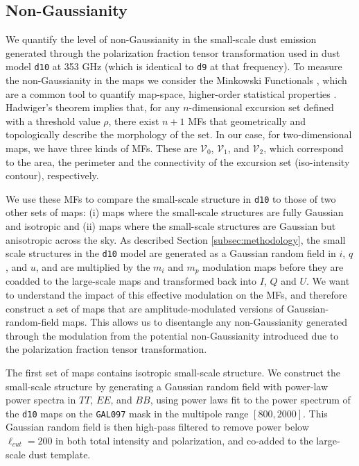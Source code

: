 \documentclass[twocolumn]{aastex631}
\begin{document}
\subsection{Non-Gaussianity} \label{sec:nongaussianity}

We quantify the level of non-Gaussianity in the small-scale dust emission generated through the polarization fraction tensor transformation used in dust model \texttt{d10} at 353 GHz (which is identical to \texttt{d9} at that frequency). To measure the non-Gaussianity in the maps we consider the Minkowski Functionals \citep[MFs,][]{Minkowski1903}, which are a common tool to quantify map-space, higher-order statistical properties \citep{Martire:2023, Carones:2024}. 
Hadwiger’s theorem \citep{hadwigerVorlesungenUeberInhalt1957}
implies that, for any $n$-dimensional excursion set defined with a threshold value $\rho$, there exist $n+1$ MFs that geometrically and topologically describe the morphology of the set. In our case, for two-dimensional maps, we have three kinds of MFs. These are $\mathcal{V}_0$, $\mathcal{V}_1$, and $\mathcal{V}_2$, which correspond to the area, the perimeter and the connectivity of the excursion set (iso-intensity contour), respectively.

We use these MFs to compare the small-scale structure in \texttt{d10} to those of two other sets of maps: (i) maps where the small-scale structures are fully Gaussian and isotropic and (ii) maps where the small-scale structures are Gaussian but anisotropic across the sky. As described Section \ref{subsec:methodology}, the small scale structures in the \texttt{d10} model are generated as a Gaussian random field in $i$, $q$, and $u$, and are multiplied by the $m_i$ and $m_p$ modulation maps before they are coadded to the large-scale maps and transformed back into $I$, $Q$ and $U$. We want to understand the impact of this effective modulation on the MFs, and therefore construct a set of maps that are amplitude-modulated versions of Gaussian-random-field maps. This allows us to disentangle any non-Gaussianity generated through the modulation from the potential non-Gaussianity introduced due to the polarization fraction tensor transformation.

The first set of maps contains isotropic small-scale structure. We construct the small-scale structure by generating a Gaussian random field with power-law power spectra in $TT$, $EE$, and $BB$, using power laws fit to the power spectrum of the \texttt{d10} maps on the \texttt{GAL097} mask in the multipole range $[800, 2000]$. This Gaussian random field is then high-pass filtered to remove power below $\ell_{cut} = 200$ in both total intensity and polarization, and co-added to the large-scale dust template.
\end{document}

